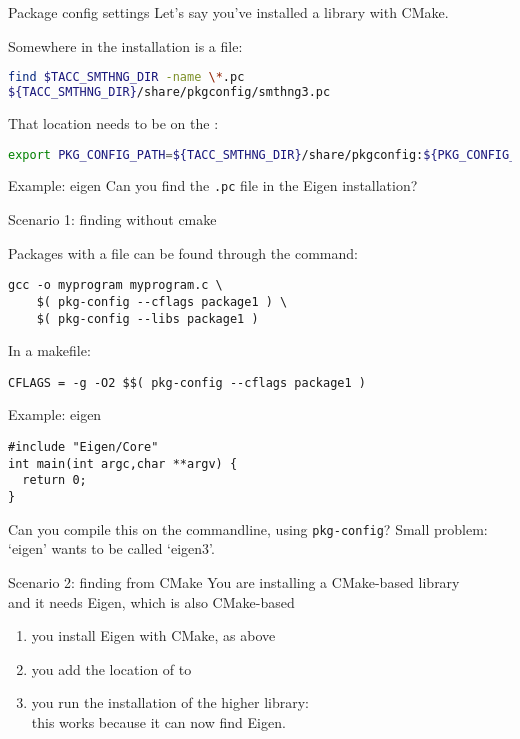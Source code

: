 \begin{numberedframe}{Package config settings}
 Let's say you've installed a library with CMake.
  
Somewhere in the installation is a  file:
\begin{lstlisting}[language=bash]
find $TACC_SMTHNG_DIR -name \*.pc
${TACC_SMTHNG_DIR}/share/pkgconfig/smthng3.pc    
\end{lstlisting}
That location needs to be on the :
\begin{lstlisting}[language=bash]
export PKG_CONFIG_PATH=${TACC_SMTHNG_DIR}/share/pkgconfig:${PKG_CONFIG_PATH}
\end{lstlisting}
\end{numberedframe}

\begin{numberedframe}{Example: eigen}
  Can you find the \lstinline{.pc} file
  in the Eigen installation?
\end{numberedframe}

\begin{numberedframe}{Scenario 1: finding without cmake}

  Packages with a  file can be found
  through the  command:
  
\begin{lstlisting}
gcc -o myprogram myprogram.c \
    $( pkg-config --cflags package1 ) \ 
    $( pkg-config --libs package1 )
\end{lstlisting}

In a makefile:
\begin{lstlisting}
CFLAGS = -g -O2 $$( pkg-config --cflags package1 )
\end{lstlisting}
\end{numberedframe}

\begin{numberedframe}{Example: eigen}
\begin{lstlisting}
#include "Eigen/Core"
int main(int argc,char **argv) {
  return 0;
}
\end{lstlisting}
Can you compile this on the commandline, using \lstinline{pkg-config}?
Small problem: `eigen' wants to be called `eigen3'.
\end{numberedframe}

\begin{numberedframe}{Scenario 2: finding from CMake}
  You are installing a CMake-based library\\
  and it needs Eigen, which is also CMake-based
  \begin{enumerate}
  \item you install Eigen with CMake, as above
  \item you add the location of  to
    \n{PKG_CONFIG_PATH}
  \item you run the installation of the higher library:\\
    this works because it can now find Eigen.
  \end{enumerate}
\end{numberedframe}

